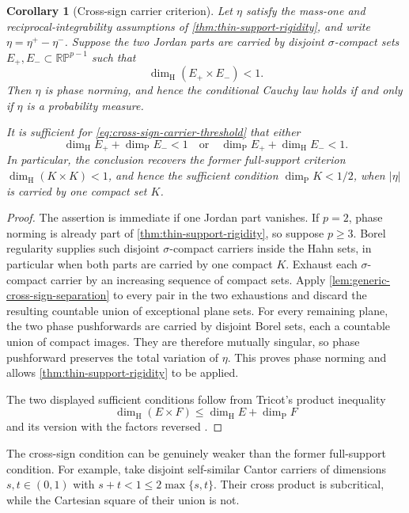 \documentclass[11pt]{article}
\numberwithin{equation}{section}
\theoremstyle{thmstyleone}%
\newtheorem{corollary}[corollary]{Corollary}
\theoremstyle{thmstyletwo}%
\let\cref\autoref
\begin{document}
\begin{corollary}[Cross-sign carrier criterion]
\label{cor:cross-sign-carrier-rigidity}
Let \(\eta\) satisfy the mass-one and reciprocal-integrability assumptions
of \cref{thm:thin-support-rigidity}, and write
\(\eta=\eta^+-\eta^-\).  Suppose the two Jordan parts are carried by
disjoint \(\sigma\)-compact sets \(E_+,E_-\subset\mathbb{RP}^{p-1}\) such that
\begin{equation}
  \dim_{\mathrm H}(E_+\times E_-)<1.
  \label{eq:cross-sign-carrier-threshold}
\end{equation}
Then \(\eta\) is phase norming, and hence the conditional Cauchy law holds
if and only if \(\eta\) is a probability measure.

It is sufficient for \cref{eq:cross-sign-carrier-threshold} that either
\[
  \dim_{\mathrm H}E_+ + \dim_{\mathrm P}E_-<1
  \quad\text{or}\quad
  \dim_{\mathrm P}E_+ + \dim_{\mathrm H}E_-<1.
\]
In particular, the conclusion recovers the former full-support criterion
\(\dim_{\mathrm H}(K\times K)<1\), and hence the sufficient condition
\(\dim_{\mathrm P}K<1/2\), when \(|\eta|\) is carried by one compact set
\(K\).
\end{corollary}

\begin{proof}
The assertion is immediate if one Jordan part vanishes.  If \(p=2\), phase
norming is already part of \cref{thm:thin-support-rigidity}, so suppose
\(p\geq3\).  Borel regularity supplies such disjoint \(\sigma\)-compact
carriers inside the Hahn sets, in particular when both parts are carried by
one compact \(K\).  Exhaust
each \(\sigma\)-compact carrier by an increasing sequence of compact sets.  Apply
\cref{lem:generic-cross-sign-separation} to every pair in the two
exhaustions and discard the resulting countable union of exceptional plane
sets.  For every remaining plane, the two phase pushforwards are carried by
disjoint Borel sets, each a countable union of compact images.  They are
therefore mutually singular, so phase pushforward preserves the total
variation of \(\eta\).  This proves phase norming and allows
\cref{thm:thin-support-rigidity} to be applied.

The two displayed sufficient conditions follow from Tricot's product
inequality
\[
  \dim_{\mathrm H}(E\times F)
  \leq\dim_{\mathrm H}E+\dim_{\mathrm P}F
\]
and its version with the factors reversed
\cite{tricot-1982,falconer-2014}.
\end{proof}

The cross-sign condition can be genuinely weaker than the former
full-support condition.  For example, take disjoint self-similar Cantor
carriers of dimensions \(s,t\in(0,1)\) with
\(s+t<1\leq2\max\{s,t\}\).  Their cross product is subcritical, while the
Cartesian square of their union is not.
\end{document}
